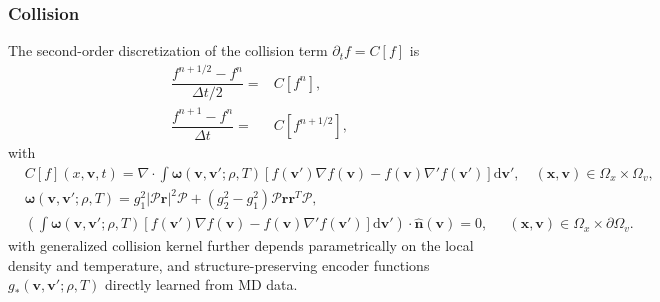 \documentclass[preprint,1p,times]{elsarticle}
\theoremstyle{definition}
\theoremstyle{remark}
\begin{document}
\subsubsection{Collision}
The second-order discretization of the collision term $\partial_{t} f = C[f]$ is 
\begin{equation}
\begin{aligned}
    \dfrac{f^{n+1/2} - f^{n}}{\Delta t/2} =& C[f^{n}] , \\
    \dfrac{f^{n+1} - f^{n}}{\Delta t} =& C[f^{n+1/2}] ,
\end{aligned}
\end{equation}
with 
\begin{equation}
    \begin{aligned}
        &C[f](x,\bm{v},t) = \nabla \cdot \int \bm{\omega}(\bm{v}, \bm{v}'; \rho, T) \left[ f(\bm{v}') \nabla f(\bm{v}) - f(\bm{v}) \nabla' f(\bm{v}') \right] \mathrm{d}\bm{v}',  \quad (\bm{x},\bm{v}) \in \Omega_{x} \times \Omega_{v} , \\
        &\bm{\omega}(\bm{v}, \bm{v}'; \rho, T) = g_{1}^{2} |\bm{\mathcal{P}}\bm{r}|^{2} \bm{\mathcal{P}} + (g_{2}^{2}-g_{1}^{2}) \bm{\mathcal{P}} \bm{r} \bm{r}^{T} \bm{\mathcal{P}} , \\
        &\left( \int \bm{\omega}(\bm{v}, \bm{v}'; \rho, T) \left[ f(\bm{v}') \nabla f(\bm{v}) - f(\bm{v}) \nabla' f(\bm{v}') \right] \mathrm{d}\bm{v}'\right) \cdot \hat{\bm{n}}(\bm{v}) = 0, ~~\quad (\bm{x},\bm{v}) \in \Omega_{x} \times \partial\Omega_{v}.
    \end{aligned}
\end{equation}
with generalized collision kernel further depends parametrically on the local density and temperature, and structure-preserving encoder functions $g_{\ast}(\bm{v}, \bm{v}'; \rho, T)$ directly learned from MD data.
\end{document}
